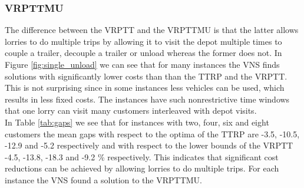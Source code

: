 %
%
%
%
%


 \subsubsection{VRPTTMU}

The difference between the VRPTT and the VRPTTMU is that the latter allows lorries to do multiple trips by allowing it to visit the depot multiple times to couple a trailer, decouple a trailer or unload whereas the former does not.
In Figure \ref{fig:single_unload} we can see that for many instances the VNS finds solutions with significantly lower costs than than the TTRP and the VRPTT.
This is not surprising since in some instances less vehicles can be used, which results in less fixed costs.
The instances have such nonrestrictive time windows that one lorry can visit many customers interleaved with depot visits. \\

In Table \ref{tab:gaps} we see that for instances with two, four, six and eight customers the mean gaps with respect to the optima of the TTRP are -3.5, -10.5, -12.9 and -5.2 respectively and with respect to the lower bounds of the VRPTT -4.5, -13.8, -18.3 and -9.2 \% respectively.
This indicates that significant cost reductions can be achieved by allowing lorries to do multiple trips.
For each instance the VNS found a solution to the VRPTTMU. \\

